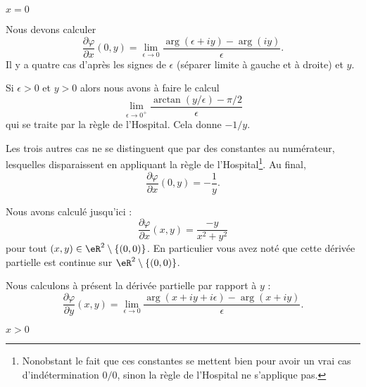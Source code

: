 \begin{normaltext}
\begin{subproof}
         \item[\( x=0\)]

             Nous devons calculer
             \begin{equation}
                 \frac{ \partial \varphi }{ \partial x }(0,y)=\lim_{\epsilon\to 0}\frac{ \arg(\epsilon+ iy)-\arg(iy) }{ \epsilon }.
             \end{equation}
             Il y a quatre cas d'après les signes de \( \epsilon\) (séparer limite à gauche et à droite) et \( y\).

             Si \( \epsilon>0\) et \( y>0\) alors nous avons à faire le calcul
             \begin{equation}
                 \lim_{\epsilon\to 0^+}\frac{ \arctan(y/\epsilon)-\pi/2 }{ \epsilon }
             \end{equation}
             qui se traite par la règle de l'Hospital. Cela donne \( -1/y\).

             Les trois autres cas ne se distinguent que par des constantes au numérateur, lesquelles disparaissent en appliquant la règle de l'Hospital\footnote{Nonobstant le fait que ces constantes se mettent bien pour avoir un vrai cas d'indétermination \( 0/0\), sinon la règle de l'Hospital ne s'applique pas.}. Au final,
             \begin{equation}
                 \frac{ \partial \varphi }{ \partial x }(0,y)=-\frac{1}{ y }.
             \end{equation}
    \end{subproof}
    
    Nous avons calculé jusqu'ici :
    \begin{equation}        \label{EQooAOJPooOrvUBR}
        \frac{ \partial \varphi }{ \partial x }(x,y)=\frac{ -y }{ x^2+y^2 }
    \end{equation}
    pour tout \( (x,y)\in \eR^2\setminus\{ (0,0) \}\). En particulier vous avez noté que cette dérivée partielle est continue sur \( \eR^2\setminus\{ (0,0) \}\).

    Nous calculons à présent la dérivée partielle par rapport à \( y\) :
    \begin{equation}
        \frac{ \partial \varphi }{ \partial y }(x,y)=\lim_{\epsilon\to 0}\frac{ \arg(x+iy+i\epsilon)-\arg(x+iy) }{ \epsilon }.
    \end{equation}
    
    \begin{subproof}

        \item[\( x>0\)]
                

\end{subproof}
\end{normaltext}
